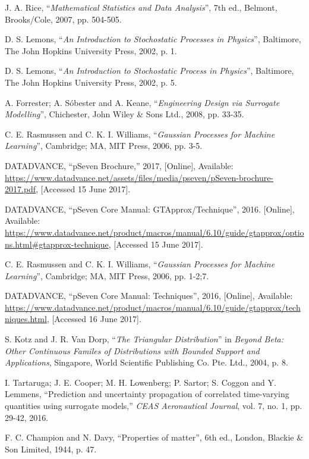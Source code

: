 \documentclass[11pt]{meetingmins}
\begin{document}
\begin{thebibliography}{99}
	J. A. Rice, “\textit{Mathematical Statistics and Data Analysis}”, 7th ed., Belmont, Brooks/Cole, 2007, pp. 504-505.

	D. S. Lemons, “\textit{An Introduction to Stochostatic Processes in Physics}”, Baltimore, The John Hopkins University Press, 2002, p. 1.

	D. S. Lemons, “\textit{An Introduction to Stochostatic Process in Physics}”, Baltimore, The John Hopkins University Press, 2002, p. 5.

	A. Forrester; A. Sóbester and A. Keane, “\textit{Engineering Design via Surrogate Modelling}”, Chichester, John Wiley \& Sons Ltd., 2008, pp. 33-35.

	C. E. Rasmussen and C. K. I. Williams, “\textit{Gaussian Processes for Machine Learning}”, Cambridge; MA, MIT Press, 2006, pp. 3-5.

	DATADVANCE, “pSeven Brochure,” 2017, [Online], Available: \url{https://www.datadvance.net/assets/files/media/pseven/pSeven-brochure-2017.pdf}, [Accessed 15 June 2017].

	DATADVANCE, “pSeven Core Manual: GTApprox/Technique”, 2016. [Online], Available: \url{https://www.datadvance.net/product/macros/manual/6.10/guide/gtapprox/options.html#gtapprox-technique}, [Accessed 15 June 2017].

	C. E. Rasmussen and C. K. I. Williams, “\textit{Gaussian Processes for Machine Learning}”, Cambridge; MA, MIT Press, 2006, pp. 1-2;7.

	DATADVANCE, “pSeven Core Manual: Techniques”, 2016, [Online], Available: \url{https://www.datadvance.net/product/macros/manual/6.10/guide/gtapprox/techniques.html}, [Accessed 16 June 2017].

	S. Kotz and J. R. Van Dorp, “\textit{The Triangular Distribution}” in \textit{Beyond Beta: Other Continuous Familes of Distributions with Bounded Support and Applications}, Singapore, World Scientific Publishing Co. Pte. Ltd., 2004, p. 8.

	I. Tartaruga; J. E. Cooper; M. H. Lowenberg; P. Sartor; S. Coggon and Y. Lemmens, “Prediction and uncertainty propagation of correlated time-varying quantities using surrogate models,” \textit{CEAS Aeronautical Journal}, vol. 7, no. 1, pp. 29-42, 2016. 

	F. C. Champion and N. Davy, “Properties of matter”, 6th ed., London, Blackie \& Son Limited, 1944, p. 47.


\end{thebibliography}
\end{document}
